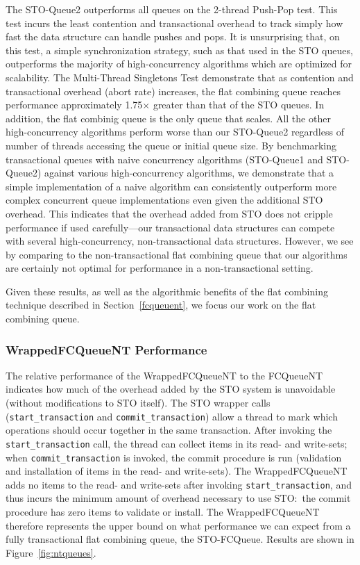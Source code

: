 The STO-Queue2 outperforms all queues on the 2-thread Push-Pop test. This test incurs the least contention and transactional overhead to track simply how fast the data structure can handle pushes and pops. It is unsurprising that, on this test, a simple synchronization strategy, such as that used in the STO queues, outperforms the majority of high-concurrency algorithms which are optimized for scalability. The Multi-Thread Singletons Test demonstrate that as contention and transactional overhead (abort rate) increases, the flat combining queue reaches performance approximately 1.75$\times$ greater than that of the STO queues. In addition, the flat combinig queue is the only queue that scales. All the other high-concurrency algorithms perform worse than our STO-Queue2 regardless of number of threads accessing the queue or initial queue size.
By benchmarking transactional queues with naive concurrency algorithms (STO-Queue1 and STO-Queue2) against various high-concurrency algorithms, we demonstrate that a simple implementation of a naive algorithm can consistently outperform more complex concurrent queue implementations even given the additional STO overhead. This indicates that the overhead added from STO does not cripple performance if used carefully---our transactional data structures can compete with several high-concurrency, non-transactional data structures. However, we see by comparing to the non-transactional flat combining queue that our algorithms are certainly not optimal for performance in a non-transactional setting.

Given these results, as well as the algorithmic benefits of the flat combining technique described in Section~\ref{fcqueuent}, we focus our work on the flat combining queue.


\subsubsection{WrappedFCQueueNT Performance}
The relative performance of the WrappedFCQueueNT to the FCQueueNT indicates how much of the overhead added by the STO system is unavoidable (without modifications to STO itself). The STO wrapper calls (\texttt{start\_transaction} and \texttt{commit\_transaction}) allow a thread to mark which operations should occur together in the same transaction. After invoking the \texttt{start\_transaction} call, the thread can collect items in its read- and write-sets; when \texttt{commit\_transaction} is invoked, the commit procedure is run (validation and installation of items in the read- and write-sets). The WrappedFCQueueNT adds no items to the read- and write-sets after invoking \texttt{start\_transaction}, and thus incurs the minimum amount of overhead necessary to use STO:\ the commit procedure has zero items to validate or install. The WrappedFCQueueNT therefore represents the upper bound on what performance we can expect from a fully transactional flat combining queue, the STO-FCQueue. 
Results are shown in Figure~\ref{fig:ntqueues}. 

